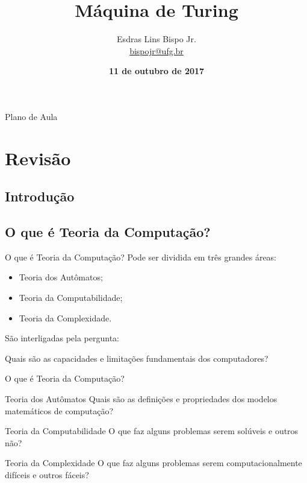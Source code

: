 \documentclass[xcolor=dvipsnames,table]{beamer}
\title{Máquina de Turing}
\author{
  Esdras Lins Bispo Jr. \\ \url{bispojr@ufg.br}
  }
\institute{
  Teoria da Computação \\Bacharelado em Ciência da Computação}
\date{\textbf{11 de outubro de 2017} }
\begin{document}
	\begin{frame}
		\titlepage
	\end{frame}

	\AtBeginSection{
		\begin{frame}{Sumário}%
    		\tableofcontents[currentsection]
		\end{frame}
	}

	\begin{frame}{Plano de Aula}
		\tableofcontents
	\end{frame}
	
	
	\section{Revisão}
	\subsection{Introdução}
	\subsection{O que é Teoria da Computação?}
	\begin{frame}{O que é Teoria da Computação?}
		Pode ser dividida em três grandes áreas:
		\begin{itemize}
			\item Teoria dos Autômatos;
			\item Teoria da Computabilidade;
			\item Teoria da Complexidade.	
		\end{itemize}
		São interligadas pela pergunta:
		\begin{block}{}
			Quais são as capacidades e limitações fundamentais dos computadores?
		\end{block}
	\end{frame}
	
	\begin{frame}{O que é Teoria da Computação?}
		\begin{block}{Teoria dos Autômatos}
			Quais são as definições e propriedades dos modelos matemáticos de computação?
		\end{block}
		\begin{block}{Teoria da Computabilidade}
			O que faz alguns problemas serem solúveis e outros não?		
		\end{block}
		\begin{block}{Teoria da Complexidade}
			O que faz alguns problemas serem computacionalmente difíceis e outros fáceis?
		\end{block}
	\end{frame}
	
\end{document}
